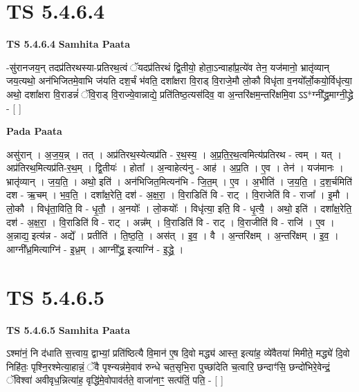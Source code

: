 \documentclass[17pt]{extarticle}
\begin{document}

\section{ TS 5.4.6.4 }

\textbf{TS 5.4.6.4 } \newline
\textbf{Samhita Paata} \newline

-सु॑रानजय॒न् तदप्र॑तिरथस्या-प्रतिरथ॒त्वं ॅयदप्र॑तिरथं द्वि॒तीयो॒ होता॒ऽन्वाहा᳚प्र॒त्ये॑व तेन॒ यज॑मानो॒ भ्रातृ॑व्यान् जय॒त्यथो॒ अन॑भिजितमे॒वाभि ज॑यति दश॒र्चं भ॑वति॒ दशा᳚क्षरा वि॒राड् वि॒राजे॒मौ लो॒कौ विधृ॑ता व॒नयो᳚र्लो॒कयो॒र्विधृ॑त्या॒ अथो॒ दशा᳚क्षरा वि॒राडन्नं॑ ॅवि॒राड् वि॒राज्ये॒वान्नाद्ये॒ प्रति॑तिष्ठ॒त्यस॑दिव॒ वा अ॒न्तरि॑क्षम॒न्तरि॑क्षमि॒वा ऽऽ*ग्नी᳚द्ध्र॒माग्नी॒द्ध्रे - [  ] \newline

\textbf{Pada Paata} \newline

असु॑रान् । अ॒ज॒य॒न्न् । तत् । अप्र॑तिरथ॒स्येत्यप्र॑ति - र॒थ॒स्य॒ । अ॒प्र॒ति॒र॒थ॒त्वमित्य॑प्रतिरथ - त्वम् । यत् । अप्र॑तिरथ॒मित्यप्र॑ति-र॒थ॒म् । द्वि॒तीयः॑ । होता᳚ । अ॒न्वाहेत्य॑नु - आह॑ । अ॒प्र॒ति । ए॒व । तेन॑ । यज॑मानः । भ्रातृ॑व्यान् । ज॒य॒ति॒ । अथो॒ इति॑ । अन॑भिजित॒मित्यन॑भि - जि॒त॒म् । ए॒व । अ॒भीति॑ । ज॒य॒ति॒ । द॒श॒र्चमिति॑ दश - ऋ॒चम् । भ॒व॒ति॒ । दशा᳚क्ष॒रेति॒ दश॑ - अ॒क्ष॒रा॒ । वि॒राडिति॑ वि - राट् । वि॒राजेति॑ वि - राजा᳚ । इ॒मौ । लो॒कौ । विधृ॑ता॒विति॒ वि - धृ॒तौ॒ । अ॒नयोः᳚ । लो॒कयोः᳚ । विधृ॑त्या॒ इति॒ वि - धृ॒त्यै॒ । अथो॒ इति॑ । दशा᳚क्ष॒रेति॒ दश॑ - अ॒क्ष॒रा॒ । वि॒राडिति॑ वि - राट् । अन्न᳚म् । वि॒राडिति॑ वि - राट् । वि॒राजीति॑ वि - राजि॑ । ए॒व । अ॒न्नाद्य॒ इत्य॑न्न - अद्ये᳚ । प्रतीति॑ । ति॒ष्ठ॒ति॒ । अस॑त् । इ॒व॒ । वै । अ॒न्तरि॑क्षम् । अ॒न्तरि॑क्षम् । इ॒व॒ । आग्नी᳚ध्र॒मित्याग्नि॑ - इ॒ध्र॒म् । आग्नी᳚द्ध्र॒ इत्याग्नि॑ - इ॒द्ध्रे॒ ।  \newline





\section{ TS 5.4.6.5 }

\textbf{TS 5.4.6.5 } \newline
\textbf{Samhita Paata} \newline

ऽश्मा॑नं॒ नि द॑धाति स॒त्त्वाय॒ द्वाभ्यां॒ प्रति॑ष्ठित्यै वि॒मान॑ ए॒ष दि॒वो मद्ध्य॑ आस्त॒ इत्या॑ह॒ व्ये॑वैतया॑ मिमीते॒ मद्ध्ये॑ दि॒वो निहि॑तः॒ पृश्नि॒रश्मेत्या॒हान्नं॒ ॅवै पृश्न्यन्न॑मे॒वाव॑ रुन्धे चत॒सृभि॒रा पुच्छा॑देति च॒त्वारि॒ छन्दाꣳ॑सि॒ छन्दो॑भिरे॒वेन्द्रं॒ ॅविश्वा॑ अवीवृध॒न्नित्या॑ह॒ वृद्धि॑मे॒वोपाव॑र्तते॒ वाजा॑नाꣳ॒॒ सत्प॑तिं॒ पति॒ - [  ] \newline
\end{document}
